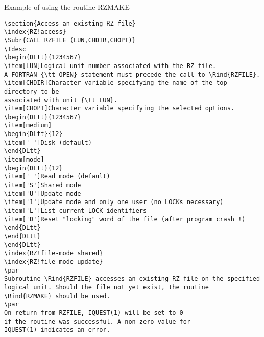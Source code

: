 \begin{XMPt}{Example of using the routine RZMAKE}
\begin{verbatim}
\section{Access an existing RZ file}
\index{RZ!access}
\Subr{CALL RZFILE (LUN,CHDIR,CHOPT)}
\Idesc
\begin{DLtt}{1234567}
\item[LUN]Logical unit number associated with the RZ file.
A FORTRAN {\tt OPEN} statement must precede the call to \Rind{RZFILE}.
\item[CHDIR]Character variable specifying the name of the top directory to be
associated with unit {\tt LUN}.
\item[CHOPT]Character variable specifying the selected options.
\begin{DLtt}{1234567}
\item[medium]
\begin{DLtt}{12}
\item[' ']Disk (default)
\end{DLtt}
\item[mode]
\begin{DLtt}{12}
\item[' ']Read mode (default)
\item['S']Shared mode
\item['U']Update mode
\item['1']Update mode and only one user (no LOCKs necessary)
\item['L']List current LOCK identifiers
\item['D']Reset "locking" word of the file (after program crash !)
\end{DLtt}
\end{DLtt}
\end{DLtt}
\index{RZ!file-mode shared}
\index{RZ!file-mode update}
\par 
Subroutine \Rind{RZFILE} accesses an existing RZ file on the specified
logical unit. Should the file not yet exist, the routine
\Rind{RZMAKE} should be used.
\par
On return from RZFILE, IQUEST(1) will be set to 0
if the routine was successful. A non-zero value for
IQUEST(1) indicates an error.

\end{verbatim}
\end{XMPt}
